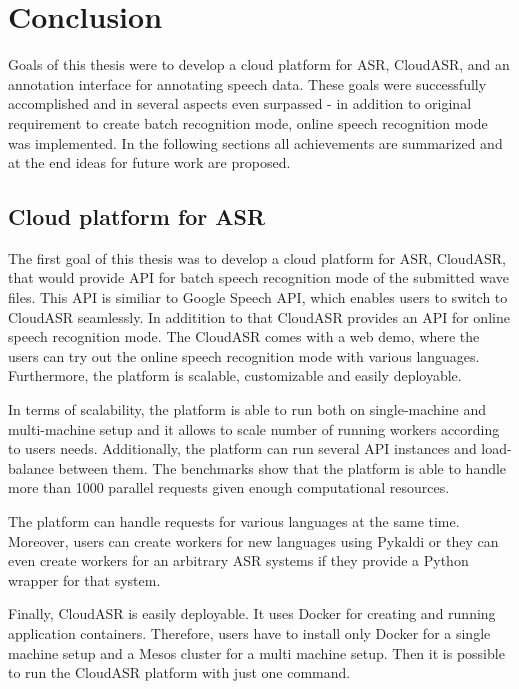 \chapter*{Conclusion}

Goals of this thesis were to develop a cloud platform for ASR, CloudASR,
  and an annotation interface for annotating speech data.
These goals were successfully accomplished and in several aspects even surpassed
  - in addition to original requirement to create batch recognition mode,
  online speech recognition mode was implemented.
In the following sections all achievements are summarized and
  at the end ideas for future work are proposed.

\section*{Cloud platform for ASR}
The first goal of this thesis was to develop a cloud platform for ASR, CloudASR,
  that would provide API for batch speech recognition mode of the submitted wave files.
This API is similiar to Google Speech API,
  which enables users to switch to CloudASR seamlessly.
In additition to that CloudASR provides an API for online speech recognition mode.
The CloudASR comes with a web demo,
  where the users can try out the online speech recognition mode with various languages.
Furthermore, the platform is scalable, customizable and easily deployable.


In terms of scalability,
  the platform is able to run both on single-machine and multi-machine setup
  and it allows to scale number of running workers according to users needs.
Additionally, the platform can run several API instances and load-balance between them.
The benchmarks show that the platform is able to handle more than 1000 parallel requests
  given enough computational resources.

The platform can handle requests for various languages at the same time.
Moreover, users can create workers for new languages using Pykaldi
  or they can even create workers for an arbitrary ASR systems
  if they provide a Python wrapper for that system.

Finally, CloudASR is easily deployable.
It uses Docker for creating and running application containers.
Therefore, users have to install only Docker for a single machine setup
  and a Mesos cluster for a multi machine setup.
Then it is possible to run the CloudASR platform with just one command.


